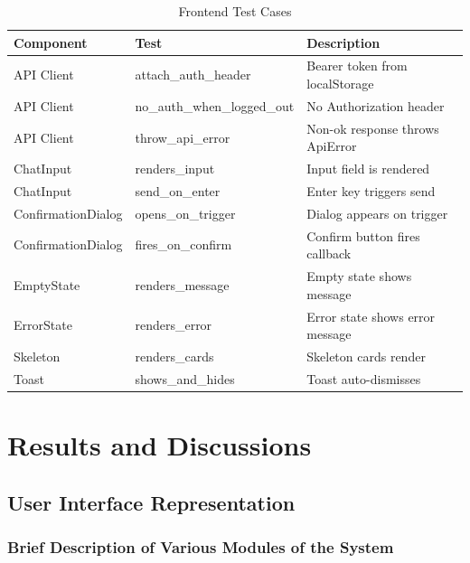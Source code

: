 \documentclass[12pt,a4paper]{report}
\begin{document}
\begin{table}[H]
    \centering
    \caption{Frontend Test Cases}
    \label{tab:frontend_tests}
    \begin{tabularx}{\textwidth}{l l X}
    \toprule
    \textbf{Component} & \textbf{Test} & \textbf{Description} \\
    \midrule
    API Client & attach\_auth\_header & Bearer token from localStorage \\
    API Client & no\_auth\_when\_logged\_out & No Authorization header \\
    API Client & throw\_api\_error & Non-ok response throws ApiError \\
    \rowcolor{gray!10}
    ChatInput & renders\_input & Input field is rendered \\
    ChatInput & send\_on\_enter & Enter key triggers send \\
    \rowcolor{gray!10}
    ConfirmationDialog & opens\_on\_trigger & Dialog appears on trigger \\
    ConfirmationDialog & fires\_on\_confirm & Confirm button fires callback \\
    \rowcolor{gray!10}
    EmptyState & renders\_message & Empty state shows message \\
    ErrorState & renders\_error & Error state shows error message \\
    \rowcolor{gray!10}
    Skeleton & renders\_cards & Skeleton cards render \\
    Toast & shows\_and\_hides & Toast auto-dismisses \\
    \bottomrule
    \end{tabularx}
\end{table}

\chapter{Results and Discussions}

\section{User Interface Representation}

\subsection{Brief Description of Various Modules of the System}
\end{document}

